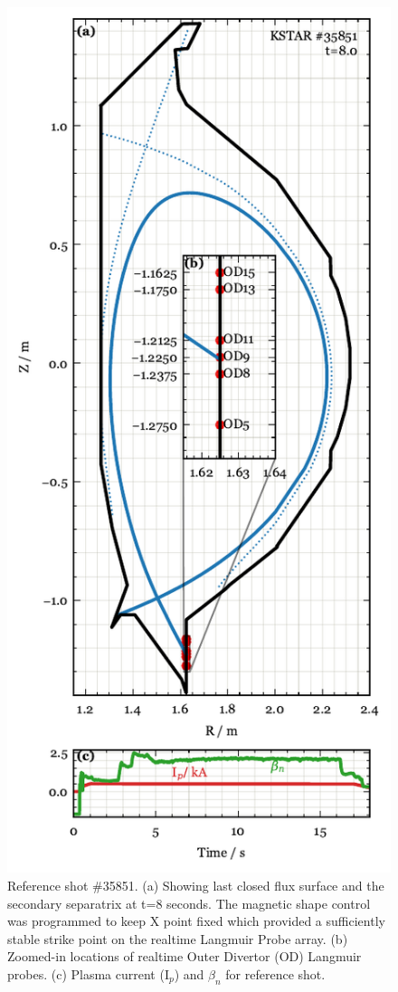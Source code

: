 \begin{figure}[!ht]
 \centering
 \includegraphics[width=\linewidth]{figures/RefShot_35851.pdf}
 \caption{
Reference shot \#35851.
(a) Showing last closed flux surface and the secondary separatrix at t=8 seconds.
The magnetic shape control was programmed to keep X point fixed which provided a sufficiently stable strike point on the realtime Langmuir Probe array.
(b) Zoomed-in locations of realtime Outer Divertor (OD) Langmuir probes.
(c) Plasma current (I$_p$) and $\beta_n$ for reference shot.
}
 \label{fig:ref_shot}
\end{figure}
